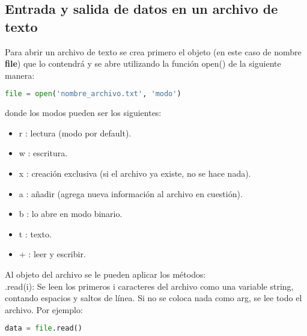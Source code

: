 \documentclass[10pt,oneside]{article}
\begin{document}
\begin{multicols}{2}
            \section{Entrada y salida de datos en un archivo de texto}

            Para abrir un archivo de texto se crea primero el objeto (en este caso de nombre \textbf{file}) que lo contendrá y se abre utilizando la función open() de la siguiente manera:
            
            \begin{lstlisting}[language=Python]
file = open('nombre_archivo.txt', 'modo')                
            \end{lstlisting}

            donde los modos pueden ser los siguientes:

            \begin{itemize}
                \item r : lectura (modo por default).
                \item w : escritura.
                \item x : creación exclusiva (si el archivo ya existe, no se hace nada).
                \item a : añadir (agrega nueva información al archivo en cuestión).
                \item b : lo abre en modo binario.
                \item t : texto.
                \item + : leer y escribir.
            \end{itemize}

            Al objeto del archivo se le pueden aplicar los métodos: \\ \newline .read(i): Se leen los primeros i caracteres del archivo como una variable string, contando espacios y saltos de línea. Si no se coloca nada como arg, se lee todo el archivo. Por ejemplo:

            \begin{lstlisting}[language=Python]
data = file.read()
            \end{lstlisting}


\end{multicols}
\end{document}
